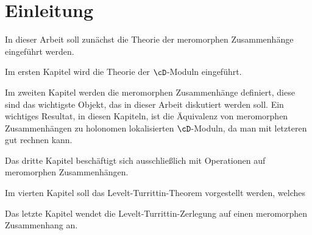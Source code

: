 \chapter{Einleitung}

\begin{comment}
Ziel der Arbeit
\end{comment}
In dieser Arbeit soll zunächst die Theorie der meromorphen Zusammenhänge
eingeführt werden.


\begin{comment}
Vorraussetzungen
\end{comment}

\begin{comment}
Aufbau / inhalt der Kapitel
\end{comment}
Im ersten Kapitel wird die Theorie der $\cD$-Moduln eingeführt.

Im zweiten Kapitel werden die meromorphen Zusammenhänge definiert, diese sind
das wichtigste Objekt, das in dieser Arbeit diskutiert werden soll.
Ein wichtiges Resultat, in diesen Kapiteln, ist die Äquivalenz von meromorphen
Zusammenhängen zu holonomen lokalisierten $\cD$-Moduln, da man mit letzteren
gut rechnen kann.

Das dritte Kapitel beschäftigt sich ausschließlich mit Operationen auf
meromorphen Zusammenhängen.

Im vierten Kapitel soll das Levelt-Turrittin-Theorem vorgestellt werden, 
welches

Das letzte Kapitel wendet die Levelt-Turrittin-Zerlegung auf einen meromorphen
Zusammenhang an.

\begin{comment}
    
\end{comment}

